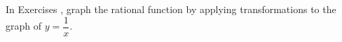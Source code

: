 {\noindent In Exercises}
{, graph the rational function by applying transformations to the graph of $y = \dfrac{1}{x}$.}

